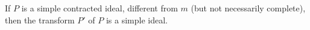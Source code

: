 If $P$ is a simple contracted ideal, different from $m$ (but not necessarily complete), then the transform $P'$ of $P$ is a simple ideal.